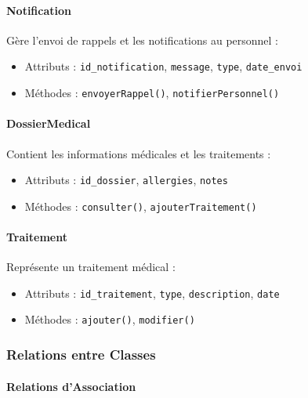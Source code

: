 \documentclass[12pt,a4paper]{report}
\begin{document}
\paragraph{Notification}

Gère l'envoi de rappels et les notifications au personnel :
\begin{itemize}
    \item Attributs : \texttt{id\_notification}, \texttt{message}, \texttt{type}, \texttt{date\_envoi}
    \item Méthodes : \texttt{envoyerRappel()}, \texttt{notifierPersonnel()}
\end{itemize}

\paragraph{DossierMedical}

Contient les informations médicales et les traitements :
\begin{itemize}
    \item Attributs : \texttt{id\_dossier}, \texttt{allergies}, \texttt{notes}
    \item Méthodes : \texttt{consulter()}, \texttt{ajouterTraitement()}
\end{itemize}

\paragraph{Traitement}

Représente un traitement médical :
\begin{itemize}
    \item Attributs : \texttt{id\_traitement}, \texttt{type}, \texttt{description}, \texttt{date}
    \item Méthodes : \texttt{ajouter()}, \texttt{modifier()}
\end{itemize}

\subsubsection{Relations entre Classes}

\paragraph{Relations d'Association}
\end{document}
